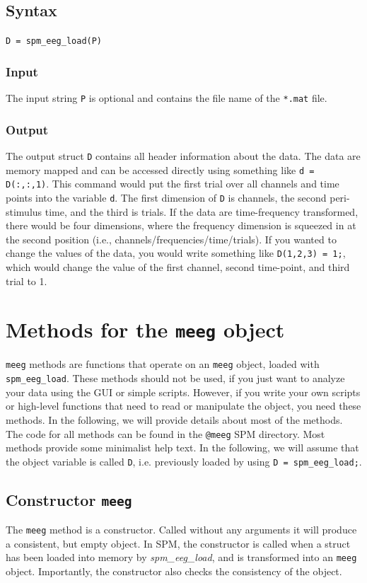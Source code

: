 \subsection{Syntax}
\texttt{D = spm\_eeg\_load(P)}
\\

\subsubsection{Input}
The input string \texttt{P} is optional and contains the file name of the \texttt{*.mat} file.

\subsubsection{Output}
The output struct \texttt{D} contains all header information about the data. The data are memory mapped and can be accessed directly using something like \texttt{d = D(:,:,1)}. This command would put the first trial over all channels and time points into the variable \texttt{d}. The first dimension of \texttt{D} is channels, the second peri-stimulus time, and the third is trials. If the data are time-frequency transformed, there would be four dimensions, where the frequency dimension is squeezed in at the second position (i.e., channels/frequencies/time/trials). If you wanted to change the values of the data, you would write something like \texttt{D(1,2,3) = 1;}, which would change the value of the first channel, second time-point, and third trial to 1.


\section{Methods for the \texttt{meeg} object}
\texttt{meeg} methods are functions that operate on an \texttt{meeg} object, loaded with \texttt{spm\_eeg\_load}. These methods should not be used, if you just want to analyze your data using the GUI or simple scripts. However, if you write your own scripts or high-level functions that need to read or manipulate the object, you need these methods. In the following, we will provide details about most of the methods. The code for all methods can be found in the \texttt{@meeg} SPM directory. Most methods provide some minimalist help text. In the following, we will assume that the object variable is called \texttt{D}, i.e. previously loaded by using \texttt{D = spm\_eeg\_load;}.

\subsection{Constructor \texttt{meeg}}
The \texttt{meeg} method is a constructor. Called without any arguments it will produce a consistent, but empty object. In SPM, the constructor is called when a struct has been loaded into memory by \textit{spm\_eeg\_load}, and is transformed into an \texttt{meeg} object. Importantly, the constructor also checks the consistency of the object.

